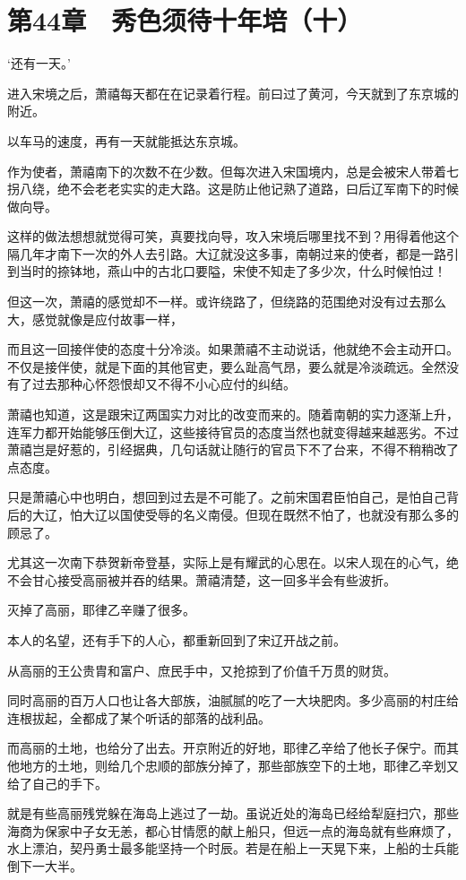 \section{第44章　秀色须待十年培（十）}

‘还有一天。’

进入宋境之后，萧禧每天都在在记录着行程。前曰过了黄河，今天就到了东京城的附近。

以车马的速度，再有一天就能抵达东京城。

作为使者，萧禧南下的次数不在少数。但每次进入宋国境内，总是会被宋人带着七拐八绕，绝不会老老实实的走大路。这是防止他记熟了道路，曰后辽军南下的时候做向导。

这样的做法想想就觉得可笑，真要找向导，攻入宋境后哪里找不到？用得着他这个隔几年才南下一次的外人去引路。大辽就没这多事，南朝过来的使者，都是一路引到当时的捺钵地，燕山中的古北口要隘，宋使不知走了多少次，什么时候怕过！

但这一次，萧禧的感觉却不一样。或许绕路了，但绕路的范围绝对没有过去那么大，感觉就像是应付故事一样，

而且这一回接伴使的态度十分冷淡。如果萧禧不主动说话，他就绝不会主动开口。不仅是接伴使，就是下面的其他官吏，要么趾高气昂，要么就是冷淡疏远。全然没有了过去那种心怀怨恨却又不得不小心应付的纠结。

萧禧也知道，这是跟宋辽两国实力对比的改变而来的。随着南朝的实力逐渐上升，连军力都开始能够压倒大辽，这些接待官员的态度当然也就变得越来越恶劣。不过萧禧岂是好惹的，引经据典，几句话就让随行的官员下不了台来，不得不稍稍改了点态度。

只是萧禧心中也明白，想回到过去是不可能了。之前宋国君臣怕自己，是怕自己背后的大辽，怕大辽以国使受辱的名义南侵。但现在既然不怕了，也就没有那么多的顾忌了。

尤其这一次南下恭贺新帝登基，实际上是有耀武的心思在。以宋人现在的心气，绝不会甘心接受高丽被并吞的结果。萧禧清楚，这一回多半会有些波折。

灭掉了高丽，耶律乙辛赚了很多。

本人的名望，还有手下的人心，都重新回到了宋辽开战之前。

从高丽的王公贵胄和富户、庶民手中，又抢掠到了价值千万贯的财货。

同时高丽的百万人口也让各大部族，油腻腻的吃了一大块肥肉。多少高丽的村庄给连根拔起，全都成了某个听话的部落的战利品。

而高丽的土地，也给分了出去。开京附近的好地，耶律乙辛给了他长子保宁。而其他地方的土地，则给几个忠顺的部族分掉了，那些部族空下的土地，耶律乙辛划又给了自己的手下。

就是有些高丽残党躲在海岛上逃过了一劫。虽说近处的海岛已经给犁庭扫穴，那些海商为保家中子女无恙，都心甘情愿的献上船只，但远一点的海岛就有些麻烦了，水上漂泊，契丹勇士最多能坚持一个时辰。若是在船上一天晃下来，上船的士兵能倒下一大半。

